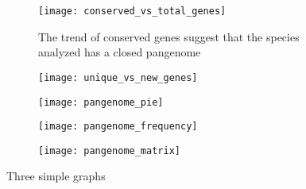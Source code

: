 \begin{figure}[h!]	%
     \centering
     \begin{subfigure}[b]{0.4\textwidth}
         \centering
         \texttt{[image: conserved\_vs\_total\_genes]}
         \caption{\scriptsize{The trend of conserved genes suggest that the species analyzed
                                has a closed pangenome}}
         \label{fig:conserved vs total}
     \end{subfigure}
     \hfill
     \begin{subfigure}[b]{0.4\textwidth}
         \centering
         \texttt{[image: unique\_vs\_new\_genes]}
         \caption{}
         \label{fig:unique vs new}
     \end{subfigure}
     \hfill
     \begin{subfigure}[b]{0.45\textwidth}
         \centering
         \texttt{[image: pangenome\_pie]}
         \caption{}
         \label{fig:pangenome pie}
     \end{subfigure}
     \hfill
     \begin{subfigure}[b]{0.45\textwidth}
         \centering
         \texttt{[image: pangenome\_frequency]}
         \caption{}
         \label{fig:pangeome frequency}
     \end{subfigure}
     \hfill
     \begin{subfigure}[b]{0.85\textwidth}
         \centering
         \texttt{[image: pangenome\_matrix]}
         \caption{}
         \label{fig:pangenome matrix}
     \end{subfigure}
        \caption{Three simple graphs}
        \label{fig:pangenome}
\end{figure}



% 





















